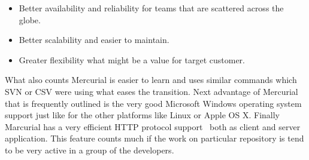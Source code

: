 \begin{itemize}
\item{Better availability and reliability for teams that are scattered across the globe.}
\item{Better scalability and easier to maintain.}
\item{Greater flexibility what might be a value for target customer.}
\end{itemize}
What also counts Mercurial is easier to learn and uses similar commands which SVN or CSV were using what eases the transition. Next advantage of Mercurial that is frequently outlined is the very good Microsoft Windows operating system support just like for the other platforms like Linux or Apple OS X. Finally Marcurial has a very efficient HTTP protocol support~\cite{google_hg_git_compare} both as client and server application. This feature counts much if the work on particular repository is tend to be very active in a group of the developers.

